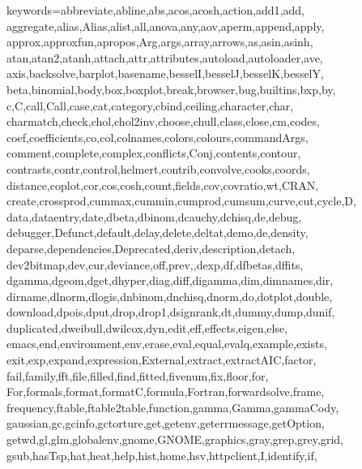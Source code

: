 \setcounter{MaxMatrixCols}{20}

\def\zz{\ifx\[$\else\aftergroup\zzz\fi}
\def\zzz{\setbox0\lastbox
\dimen0\dimexpr\extrarowheight + \ht0-\dp0\relax
\setbox0\hbox{\raise-.5\dimen0\box0}%
\ht0=\dimexpr\ht0+\extrarowheight\relax
\dp0=\dimexpr\dp0+\extrarowheight\relax
\box0
}

%
{keywords={abbreviate,abline,abs,acos,acosh,action,add1,add,%
        aggregate,alias,Alias,alist,all,anova,any,aov,aperm,append,apply,%
        approx,approxfun,apropos,Arg,args,array,arrows,as,asin,asinh,%
        atan,atan2,atanh,attach,attr,attributes,autoload,autoloader,ave,%
        axis,backsolve,barplot,basename,besselI,besselJ,besselK,besselY,%
        beta,binomial,body,box,boxplot,break,browser,bug,builtins,bxp,by,%
        c,C,call,Call,case,cat,category,cbind,ceiling,character,char,%
        charmatch,check,chol,chol2inv,choose,chull,class,close,cm,codes,%
        coef,coefficients,co,col,colnames,colors,colours,commandArgs,%
        comment,complete,complex,conflicts,Conj,contents,contour,%
        contrasts,contr,control,helmert,contrib,convolve,cooks,coords,%
        distance,coplot,cor,cos,cosh,count,fields,cov,covratio,wt,CRAN,%
        create,crossprod,cummax,cummin,cumprod,cumsum,curve,cut,cycle,D,%
        data,dataentry,date,dbeta,dbinom,dcauchy,dchisq,de,debug,%
        debugger,Defunct,default,delay,delete,deltat,demo,de,density,%
        deparse,dependencies,Deprecated,deriv,description,detach,%
        dev2bitmap,dev,cur,deviance,off,prev,,dexp,df,dfbetas,dffits,%
        dgamma,dgeom,dget,dhyper,diag,diff,digamma,dim,dimnames,dir,%
        dirname,dlnorm,dlogis,dnbinom,dnchisq,dnorm,do,dotplot,double,%
        download,dpois,dput,drop,drop1,dsignrank,dt,dummy,dump,dunif,%
        duplicated,dweibull,dwilcox,dyn,edit,eff,effects,eigen,else,%
        emacs,end,environment,env,erase,eval,equal,evalq,example,exists,%
        exit,exp,expand,expression,External,extract,extractAIC,factor,%
        fail,family,fft,file,filled,find,fitted,fivenum,fix,floor,for,%
        For,formals,format,formatC,formula,Fortran,forwardsolve,frame,%
        frequency,ftable,ftable2table,function,gamma,Gamma,gammaCody,%
        gaussian,gc,gcinfo,gctorture,get,getenv,geterrmessage,getOption,%
        getwd,gl,glm,globalenv,gnome,GNOME,graphics,gray,grep,grey,grid,%
        gsub,hasTsp,hat,heat,help,hist,home,hsv,httpclient,I,identify,if,%
}}

